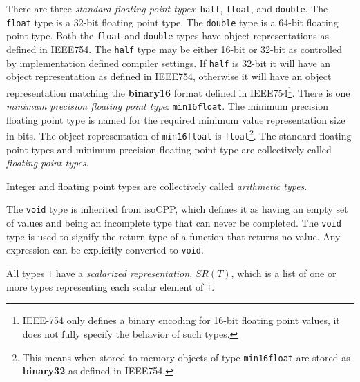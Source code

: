\p There are three \textit{standard floating point types}: \texttt{half},
\texttt{float}, and \texttt{double}. The \texttt{float} type is a 32-bit
floating point type. The \texttt{double} type is a 64-bit floating point type.
Both the \texttt{float} and \texttt{double} types have object representations as
defined in \gls{IEEE754}. The \texttt{half} type may be either 16-bit or 32-bit
as controlled by implementation defined compiler settings. If \texttt{half} is
32-bit it will have an object representation as defined in \gls{IEEE754},
otherwise it will have an object representation matching the \textbf{binary16}
format defined in \gls{IEEE754}\footnote{IEEE-754 only defines a binary encoding
for 16-bit floating point values, it does not fully specify the behavior of such
types.}. There is one \textit{minimum precision floating point type}:
\texttt{min16float}. The minimum precision floating point type is named for the
required minimum value representation size in bits. The object representation of
\texttt{min16float} is \texttt{float}\footnote{This means when stored to memory
objects of type \texttt{min16float} are stored as \textbf{binary32} as defined
in \gls{IEEE754}.}. The standard floating point types and minimum precision
floating point type are collectively called \textit{floating point types}.

\p Integer and floating point types are collectively called \textit{arithmetic
types}.

\p The \texttt{void} type is inherited from \gls{isoCPP}, which defines it as
having an empty set of values and being an incomplete type that can never be
completed. The \texttt{void} type is used to signify the return type of a
function that returns no value. Any expression can be explicitly converted to
\texttt{void}.


\p All types \texttt{T} have a \textit{scalarized representation}, \(SR(T)\),
which is a list of one or more types representing each scalar element of
\texttt{T}.

